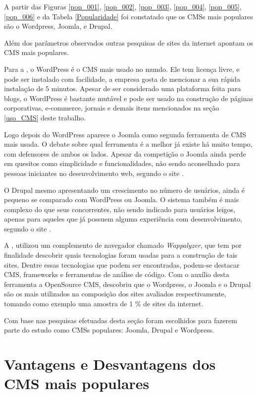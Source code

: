 A partir das Figuras \ref{pop_001}, \ref{pop_002}, \ref{pop_003}, \ref{pop_004}, \ref{pop_005}, \ref{pop_006} e da Tabela \ref{Popularidade} foi constatado que os CMSs mais populares são o Wordpress, Joomla, e Drupal.

Além dos parâmetros observados outras pesquisas de sites da internet apontam os CMS mais populares.

Para a , o WordPress é o CMS mais usado no mundo. Ele tem licença livre, e pode ser instalado com facilidade, a empresa gosta de mencionar a sua rápida instalação de 5 minutos. Apesar de ser considerado uma plataforma feita para blogs, o WordPress é bastante mutável e pode ser usado na construção de páginas corporativas, e-commerce, jornais e demais itens mencionados na seção \ref{uso_CMS} deste trabalho. 
 
 Logo depois do WordPress aparece o Joomla como segunda ferramenta de CMS mais usada. O debate sobre qual ferramenta é a melhor já existe há muito tempo, com defensores de ambos os lados. Apesar da competição o Joomla ainda perde em quesitos como simplicidade e funcionalidades, não sendo aconselhado para pessoas iniciantes no desenvolvimento web, segundo o site . 

 O Drupal mesmo apresentando um crescimento no número de usuários, ainda é pequeno se comparado com WordPress ou Joomla. O sistema também é mais complexo do que seus concorrentes, não sendo indicado para usuários leigos, apenas para aqueles que já possuem alguma experiência com desenvolvimento, segundo o site .


A , utilizou um complemento de navegador chamado\textit{ Wappalyzer}, que tem por finalidade descobrir quais tecnologias foram usadas para a construção de tais sites. Dentre essas tecnologias que podem ser encontradas, podem-se destacar CMS, frameworks e ferramentas de análise de código. Com o auxílio desta ferramenta a OpenSource CMS, descobriu que o Wordpress, o Joomla e o Drupal são os mais utilizados na composição dos sites avaliados respectivamente, tomando como exemplo uma amostra de 1 \% de sites da internet.


Com base nas pesquisas efetuadas desta seção foram escolhidos para fazerem parte do estudo como CMSs populares: Joomla, Drupal e Wordpress.

\section{Vantagens e Desvantagens dos CMS mais populares}
\label{Cms_vantagens}

